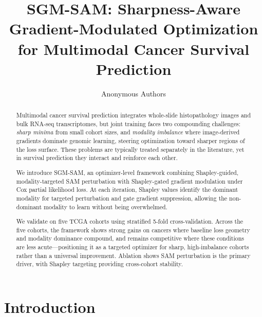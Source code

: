 \documentclass[runningheads]{llncs}
\begin{document}
\title{SGM-SAM: Sharpness-Aware Gradient-Modulated Optimization for Multimodal Cancer Survival Prediction}
\author{Anonymous Authors}
\maketitle

\begin{abstract}
Multimodal cancer survival prediction integrates whole-slide
histopathology images and bulk RNA-seq transcriptomes, but joint
training faces two compounding challenges: \textit{sharp minima}
from small cohort sizes, and \textit{modality imbalance} where
image-derived gradients dominate genomic learning, steering
optimization toward sharper regions of the loss
surface. These problems are
typically treated separately in the literature, yet in survival
prediction they interact and reinforce each other.

We introduce SGM-SAM, an optimizer-level framework combining
Shapley-guided, modality-targeted SAM perturbation with
Shapley-gated gradient modulation under Cox partial likelihood
loss. At each iteration, Shapley
values identify the dominant modality for
targeted perturbation and gate gradient suppression, allowing the
non-dominant modality to learn without being overwhelmed.

We validate on five TCGA cohorts using stratified 5-fold
cross-validation. Across the five cohorts, the framework shows strong
gains on cancers where baseline loss geometry and modality dominance
compound, and remains competitive where these conditions are less
acute---positioning it as a targeted optimizer for sharp,
high-imbalance cohorts rather than a universal improvement. Ablation
shows SAM perturbation is the primary driver, with Shapley targeting
providing cross-cohort stability.
\end{abstract}


\section{Introduction}
\end{document}

